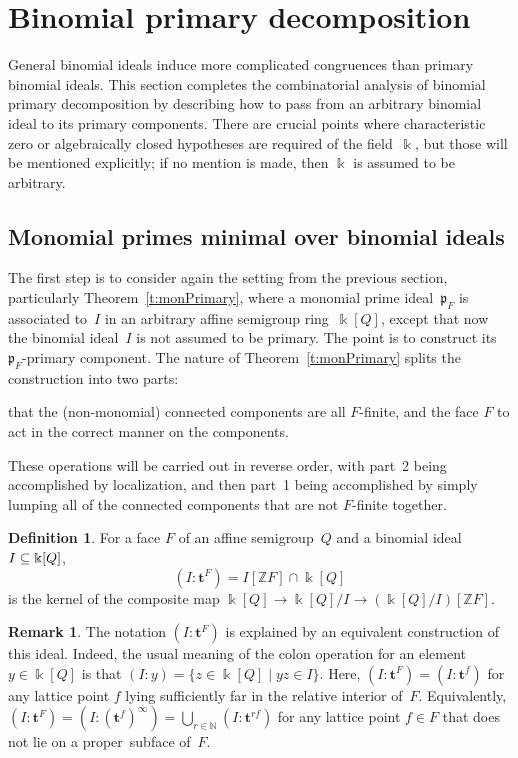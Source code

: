\documentclass[12pt]{amsart}
\numberwithin{equation}{section}
\theoremstyle{definition}
\newtheorem{defn}[thm]{Definition}
\newtheorem{remark}[thm]{Remark}
\begin{document}
\section{Binomial primary decomposition}\label{s:decomp}

General binomial ideals induce more complicated congruences than
primary binomial ideals.  This section completes the combinatorial
analysis of binomial primary
decomposition by describing how to pass from an arbitrary binomial
ideal to its primary components.
There are crucial points where characteristic zero or algebraically
closed hypotheses are required of the field~${\Bbbk}$, but those will be
mentioned explicitly; if no mention is made, then ${\Bbbk}$ is assumed to
be arbitrary.

\subsection{Monomial primes minimal over binomial ideals}\label{s:minMonom}

The first step is to consider again the setting from the previous
section, particularly Theorem~\ref{t:monPrimary}, where a monomial
prime ideal~${\mathfrak{p}}_F$ is associated to~$I$ in an arbitrary affine
semigroup ring~${\Bbbk}[Q]$, except that now the binomial ideal~$I$ is not
assumed to be primary.  The point is to construct its ${\mathfrak{p}}_F$-primary
component.  The nature of Theorem~\ref{t:monPrimary} splits the
construction into two parts:
\begin{enumerate}
\itemensuring that the (non-monomial) connected components are all
$F$-finite, and
\itemforcing the face $F$ to act in the correct manner on the components.
\end{enumerate}
These operations will be carried out in reverse order, with part~2
being accomplished by localization, and then part~1 being accomplished
by simply lumping all of the
connected components that are not $F$-finite together.

\begin{defn}
For a face $F$ of an affine semigroup~$Q$ and a binomial ideal $I
\subseteq\nolinebreak {\Bbbk}[Q]$,
$$  (I:{\mathbf{t}}^F)
  = I[{\mathbb{Z}} F] \cap {\Bbbk}[Q]
$$
is the kernel of the composite map ${\Bbbk}[Q] \to {\Bbbk}[Q]/I \to
({\Bbbk}[Q]/I)[{\mathbb{Z}} F]$.
\end{defn}

\begin{remark}
The notation $(I:{\mathbf{t}}^F)$ is explained by an equivalent construction
of this ideal.  Indeed, the usual meaning of the colon operation for
an element $y \in {\Bbbk}[Q]$ is that $(I:y) = \{z \in {\Bbbk}[Q] \mid yz \in
I\}$.  Here, $(I:{\mathbf{t}}^F) = (I:{\mathbf{t}}^f)$ for any lattice point $f$ lying
sufficiently far in the relative interior of~$F$.  Equivalently,
$(I:{\mathbf{t}}^F) = (I:({\mathbf{t}}^f)^\infty) = \bigcup_{r \in {\mathbb{N}}} (I:{\mathbf{t}}^{rf})$
for any lattice point $f \in F$ that does not lie on a proper~subface
of~$F$.
\end{remark}
\end{document}
